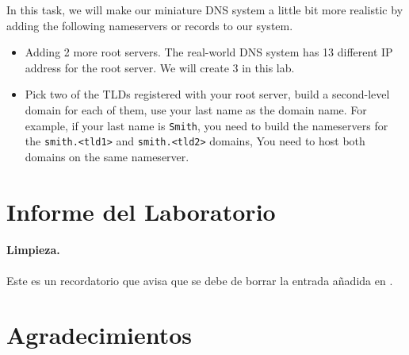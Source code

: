 In this task, we will make our miniature DNS system
a little bit more realistic by adding the following 
nameservers or records to our system. 


\begin{itemize}
\item Adding 2 more root servers. The real-world DNS system has 13 different 
IP address for the root server. We will create 3 in this lab.


\item Pick two of the TLDs registered with your root server, 
build a second-level domain for each of them, use your last name as the domain name. 
For example, if your last name is \texttt{Smith}, you need to build the 
nameservers for the \texttt{smith.<tld1>} and \texttt{smith.<tld2>} domains,
You need to host both domains on the same nameserver. 
\end{itemize}





 


\section{Informe del Laboratorio}



\paragraph{Limpieza.} Este es un recordatorio que avisa que se debe de borrar la entrada añadida en .

\section*{Agradecimientos}





